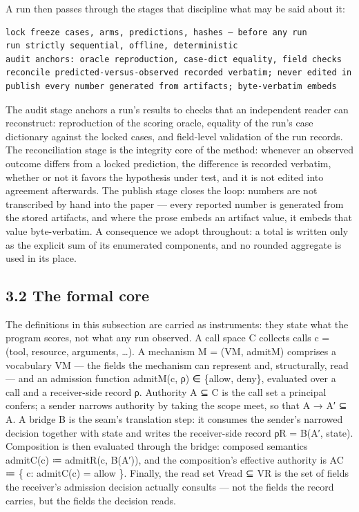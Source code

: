 \documentclass[
  10pt,
]{article}
\renewcommand{\_}{\origunderscore\allowbreak}
\begin{document}
A run then passes through the stages that discipline what may be said
about it:

\begin{verbatim}
lock freeze cases, arms, predictions, hashes — before any run
run strictly sequential, offline, deterministic
audit anchors: oracle reproduction, case-dict equality, field checks
reconcile predicted-versus-observed recorded verbatim; never edited in
publish every number generated from artifacts; byte-verbatim embeds
\end{verbatim}

The audit stage anchors a run's results to checks that an independent
reader can reconstruct: reproduction of the scoring oracle, equality of
the run's case dictionary against the locked cases, and field-level
validation of the run records. The reconciliation stage is the integrity
core of the method: whenever an observed outcome differs from a locked
prediction, the difference is recorded verbatim, whether or not it
favors the hypothesis under test, and it is not edited into agreement
afterwards. The publish stage closes the loop: numbers are not
transcribed by hand into the paper --- every reported number is
generated from the stored artifacts, and where the prose embeds an
artifact value, it embeds that value byte-verbatim. A consequence we
adopt throughout: a total is written only as the explicit sum of its
enumerated components, and no rounded aggregate is used in its place.

\subsection{3.2 The formal core}\label{the-formal-core}

The definitions in this subsection are carried as instruments: they
state what the program scores, not what any run observed. A call space C
collects calls c = (tool, resource, arguments, \ldots). A mechanism M =
(V\_M, admit\_M) comprises a vocabulary V\_M --- the fields the
mechanism can represent and, structurally, read --- and an admission
function admit\_M(c, ρ) ∈ \{allow, deny\}, evaluated over a call and a
receiver-side record ρ. Authority A ⊆ C is the call set a principal
confers; a sender narrows authority by taking the scope meet, so that A
→ A′ ⊆ A. A bridge B is the seam's translation step: it consumes the
sender's narrowed decision together with state and writes the
receiver-side record \mbox{ρ\_R} = B(A′, state). Composition is then evaluated
through the bridge: composed semantics admit\_C(c) ≔ admit\_R(c, B(A′)),
and the composition's effective authority is A\_C ≔ \{ c: admit\_C(c) =
allow \}. Finally, the read set V\_read ⊆ V\_R is the set of fields the
receiver's admission decision actually consults --- not the fields the
record carries, but the fields the decision reads.
\end{document}

